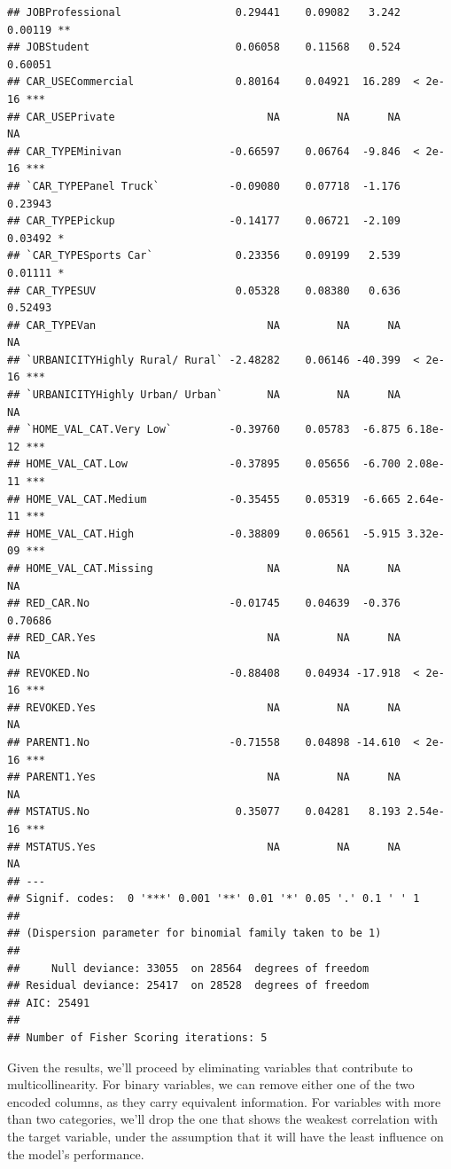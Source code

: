 \documentclass[
]{article}
\begin{document}
\begin{verbatim}
## JOBProfessional                  0.29441    0.09082   3.242  0.00119 ** 
## JOBStudent                       0.06058    0.11568   0.524  0.60051    
## CAR_USECommercial                0.80164    0.04921  16.289  < 2e-16 ***
## CAR_USEPrivate                        NA         NA      NA       NA    
## CAR_TYPEMinivan                 -0.66597    0.06764  -9.846  < 2e-16 ***
## `CAR_TYPEPanel Truck`           -0.09080    0.07718  -1.176  0.23943    
## CAR_TYPEPickup                  -0.14177    0.06721  -2.109  0.03492 *  
## `CAR_TYPESports Car`             0.23356    0.09199   2.539  0.01111 *  
## CAR_TYPESUV                      0.05328    0.08380   0.636  0.52493    
## CAR_TYPEVan                           NA         NA      NA       NA    
## `URBANICITYHighly Rural/ Rural` -2.48282    0.06146 -40.399  < 2e-16 ***
## `URBANICITYHighly Urban/ Urban`       NA         NA      NA       NA    
## `HOME_VAL_CAT.Very Low`         -0.39760    0.05783  -6.875 6.18e-12 ***
## HOME_VAL_CAT.Low                -0.37895    0.05656  -6.700 2.08e-11 ***
## HOME_VAL_CAT.Medium             -0.35455    0.05319  -6.665 2.64e-11 ***
## HOME_VAL_CAT.High               -0.38809    0.06561  -5.915 3.32e-09 ***
## HOME_VAL_CAT.Missing                  NA         NA      NA       NA    
## RED_CAR.No                      -0.01745    0.04639  -0.376  0.70686    
## RED_CAR.Yes                           NA         NA      NA       NA    
## REVOKED.No                      -0.88408    0.04934 -17.918  < 2e-16 ***
## REVOKED.Yes                           NA         NA      NA       NA    
## PARENT1.No                      -0.71558    0.04898 -14.610  < 2e-16 ***
## PARENT1.Yes                           NA         NA      NA       NA    
## MSTATUS.No                       0.35077    0.04281   8.193 2.54e-16 ***
## MSTATUS.Yes                           NA         NA      NA       NA    
## ---
## Signif. codes:  0 '***' 0.001 '**' 0.01 '*' 0.05 '.' 0.1 ' ' 1
## 
## (Dispersion parameter for binomial family taken to be 1)
## 
##     Null deviance: 33055  on 28564  degrees of freedom
## Residual deviance: 25417  on 28528  degrees of freedom
## AIC: 25491
## 
## Number of Fisher Scoring iterations: 5
\end{verbatim}

Given the results, we'll proceed by eliminating variables that
contribute to multicollinearity. For binary variables, we can remove
either one of the two encoded columns, as they carry equivalent
information. For variables with more than two categories, we'll drop the
one that shows the weakest correlation with the target variable, under
the assumption that it will have the least influence on the model's
performance.
\end{document}
